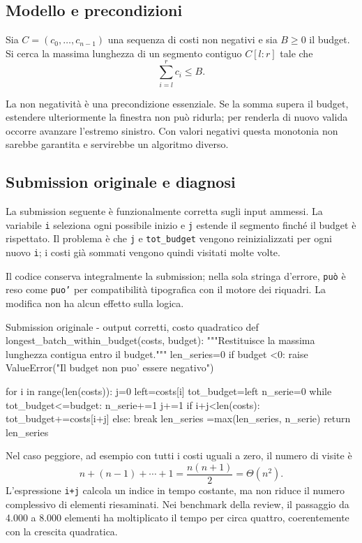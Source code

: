 \subsection{Modello e precondizioni}

Sia $C=(c_0,\ldots,c_{n-1})$ una sequenza di costi non negativi e sia
$B\geq 0$ il budget. Si cerca la massima lunghezza di un segmento contiguo
$C[l:r]$ tale che
\[
  \sum_{i=l}^{r} c_i \leq B.
\]

La non negatività è una precondizione essenziale. Se la somma supera il
budget, estendere ulteriormente la finestra non può ridurla; per renderla di
nuovo valida occorre avanzare l'estremo sinistro. Con valori negativi questa
monotonia non sarebbe garantita e servirebbe un algoritmo diverso.

\subsection{Submission originale e diagnosi}

La submission seguente è funzionalmente corretta sugli input ammessi. La
variabile \texttt{i} seleziona ogni possibile inizio e \texttt{j} estende il
segmento finché il budget è rispettato. Il problema è che \texttt{j} e
\texttt{tot\_budget} vengono reinizializzati per ogni nuovo \texttt{i}; i
costi già sommati vengono quindi visitati molte volte.

Il codice conserva integralmente la submission; nella sola stringa d'errore,
\texttt{può} è reso come \texttt{puo'} per compatibilità tipografica con il
motore dei riquadri. La modifica non ha alcun effetto sulla logica.

\begin{inefficientcode}{Submission originale - output corretti, costo quadratico}
def longest_batch_within_budget(costs, budget):
    """Restituisce la massima lunghezza contigua entro il budget."""
    len_series=0
    if budget <0:
        raise ValueError("Il budget non puo' essere negativo")

    for i in range(len(costs)):
        j=0
        left=costs[i]
        tot_budget=left
        n_serie=0
        while tot_budget<=budget:
            n_serie+=1
            j+=1
            if i+j<len(costs):
                tot_budget+=costs[i+j]
            else:
                break
        len_series =max(len_series, n_serie)
    return len_series
\end{inefficientcode}

Nel caso peggiore, ad esempio con tutti i costi uguali a zero, il numero di
visite è
\[
  n+(n-1)+\cdots+1=\frac{n(n+1)}{2}=\Theta(n^2).
\]
L'espressione \texttt{i+j} calcola un indice in tempo costante, ma non riduce
il numero complessivo di elementi riesaminati. Nei benchmark della review, il
passaggio da 4.000 a 8.000 elementi ha moltiplicato il tempo per circa quattro,
coerentemente con la crescita quadratica.

